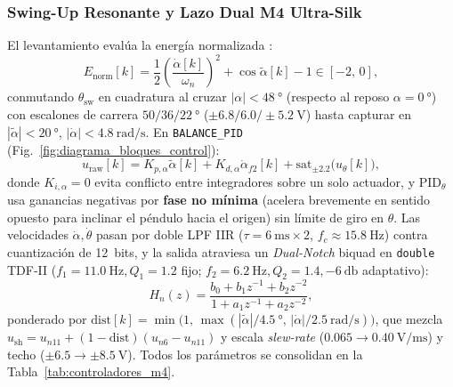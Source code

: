 \subsubsection{Swing-Up Resonante y Lazo Dual M4 Ultra-Silk}
El levantamiento evalúa la energía normalizada \cite{astrom2000,spong1995}:
\begin{equation}
    E_{\text{norm}}[k] = \frac{1}{2}\left(\frac{\dot{\alpha}[k]}{\omega_n}\right)^2 + \cos\tilde{\alpha}[k] - 1 \in [-2,\, 0],
    \label{eq:energia_swingup}
\end{equation}
conmutando $\theta_{\text{sw}}$ en cuadratura al cruzar $|\alpha|<\qty{48}{\degree}$ (respecto al reposo $\alpha=\qty{0}{\degree}$) con escalones de carrera $50/36/\qty{22}{\degree}$ ($\pm 6.8/6.0/\pm\qty{5.2}{\volt}$) hasta capturar en $|\tilde{\alpha}|<\qty{20}{\degree}$, $|\dot{\alpha}|<\qty{4.8}{\radian\per\second}$. En \texttt{BALANCE\_PID} (Fig.~\ref{fig:diagrama_bloques_control}):
\begin{equation}
    u_{\text{raw}}[k] = K_{p,\alpha}\tilde{\alpha}[k] + K_{d,\alpha}\dot{\alpha}_{f2}[k] + \mathrm{sat}_{\pm 2.2}\!\bigl(u_{\theta}[k]\bigr),
    \label{eq:m4_dual}
\end{equation}
donde $K_{i,\alpha}=0$ evita conflicto entre integradores sobre un solo actuador, y $\text{PID}_\theta$ usa ganancias negativas por \textbf{fase no mínima} (acelera brevemente en sentido opuesto para inclinar el péndulo hacia el origen) sin límite de giro en $\theta$. Las velocidades $\dot{\alpha},\dot{\theta}$ pasan por doble LPF IIR ($\tau=\qty{6}{\milli\second}\times 2$, $f_c\approx\qty{15.8}{\hertz}$) contra cuantización de 12~bits, y la salida atraviesa un \textit{Dual-Notch} biquad en \texttt{double} TDF-II \cite{Oppenheim2010} ($f_1=\qty{11.0}{\hertz}, Q_1=1.2$ fijo; $f_2=\qty{6.2}{\hertz}, Q_2=1.4, \qty{-6}{\decibel}$ adaptativo):
\begin{equation}
    H_{n}(z) = \frac{b_0 + b_1 z^{-1} + b_2 z^{-2}}{1 + a_1 z^{-1} + a_2 z^{-2}},
    \label{eq:dual_notch}
\end{equation}
ponderado por $\mathrm{dist}[k] = \min\bigl(1,\, \max(|\tilde{\alpha}|/\qty{4.5}{\degree},\, |\dot{\alpha}|/\qty{2.5}{\radian\per\second})\bigr)$, que mezcla $u_{\text{sh}} = u_{n11} + (1-\mathrm{dist})(u_{n6}-u_{n11})$ y escala \textit{slew-rate} ($0.065\to\qty{0.40}{\volt\per\milli\second}$) y techo ($\pm 6.5\to\pm\qty{8.5}{\volt}$). Todos los parámetros se consolidan en la Tabla~\ref{tab:controladores_m4}.



